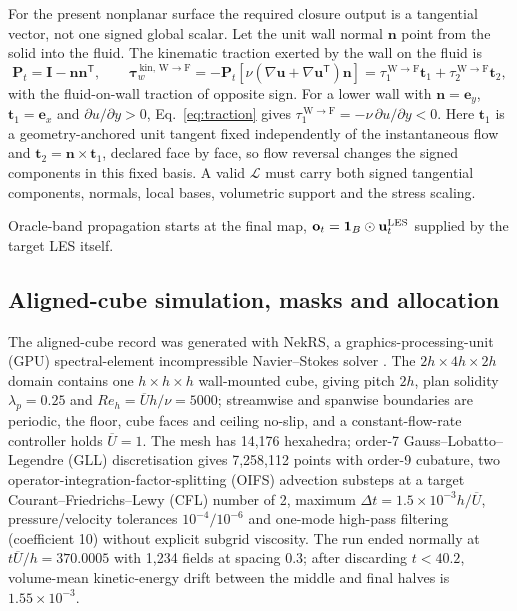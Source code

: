 For the present nonplanar surface the required closure output is a tangential vector, not one
signed global scalar. Let the unit wall normal $\mathbf n$ point from the solid into the fluid.
The kinematic traction exerted by the wall on the fluid is
\begin{equation}
\mathbf P_t=\mathbf I-\mathbf n\mathbf n^\mathsf T,\qquad
\boldsymbol\tau_w^{\,\mathrm{kin},\,\mathrm{W\to F}}
=-\mathbf P_t\!\left[\nu(\nabla\mathbf u+\nabla\mathbf u^\mathsf T)\mathbf n\right]
=\tau_1^{\,\mathrm{W\to F}}\mathbf t_1+\tau_2^{\,\mathrm{W\to F}}\mathbf t_2 ,
\label{eq:traction}
\end{equation}
with the fluid-on-wall traction of opposite sign. For a lower wall with
$\mathbf n=\mathbf e_y$, $\mathbf t_1=\mathbf e_x$ and $\partial u/\partial y>0$,
Eq.~\eqref{eq:traction} gives $\tau_1^{\,\mathrm{W\to F}}=-\nu\,\partial u/\partial y<0$. Here
$\mathbf t_1$ is a geometry-anchored unit tangent fixed independently of the instantaneous flow
and $\mathbf t_2=\mathbf n\times\mathbf t_1$, declared face by face, so flow reversal changes the
signed components in this fixed basis. A valid $\mathcal L$
must carry both signed tangential components, normals, local bases, volumetric support and the
stress scaling.

Oracle-band propagation starts at the final map, $\mathbf o_t=\mathbf 1_B\odot\mathbf u_t^{\rm LES}$ supplied by the
target LES itself.

\subsection{Aligned-cube simulation, masks and allocation}\label{sec:data}

The aligned-cube record was generated with NekRS, a graphics-processing-unit (GPU)
spectral-element incompressible
Navier--Stokes solver \cite{fischer2022nekrs}. The $2h\times4h\times2h$ domain contains one
$h\times h\times h$ wall-mounted cube, giving pitch $2h$, plan solidity $\lambda_p=0.25$ and
$Re_h=\overline U h/\nu=5000$; streamwise and spanwise boundaries are periodic, the floor, cube
faces and ceiling no-slip, and a constant-flow-rate controller holds $\overline U=1$. The mesh has
14,176 hexahedra; order-7 Gauss--Lobatto--Legendre (GLL) discretisation gives 7,258,112 points
with order-9 cubature, two operator-integration-factor-splitting (OIFS) advection substeps at a
target Courant--Friedrichs--Lewy (CFL) number of 2, maximum
$\Delta t=1.5\times10^{-3}h/\overline U$, pressure/velocity tolerances $10^{-4}/10^{-6}$ and
one-mode high-pass filtering (coefficient 10) without explicit subgrid viscosity. The run ended
normally at $t\overline U/h=370.0005$ with 1,234 fields at spacing 0.3; after discarding
$t<40.2$, volume-mean kinetic-energy drift between the middle and final halves is
$1.55\times10^{-3}$.

